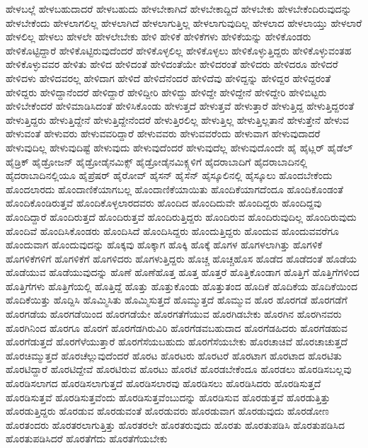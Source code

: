 {ಹೇಳಬಲ್ಲೆ
ಹೇಳಬಹುದಾದರೆ
ಹೇಳಬಹುದು
ಹೇಳಬೇಕಾಗಿದೆ
ಹೇಳಬೇಕಾದ್ದಿದೆ
ಹೇಳಬೇಕು
ಹೇಳಬೇಕೆಂದಿರುವುದನ್ನು
ಹೇಳಬೇಕೆಂದು
ಹೇಳಲಾಗಲಿಲ್ಲ
ಹೇಳಲಾಗಿದೆ
ಹೇಳಲಾಗುತ್ತಿಲ್ಲ
ಹೇಳಲಾಗುವುದಿಲ್ಲ
ಹೇಳಲಾದ
ಹೇಳಲಾಯ್ತು
ಹೇಳಲಾರೆ
ಹೇಳಲಿಲ್ಲ
ಹೇಳಲು
ಹೇಳಲೇ
ಹೇಳಲೇಬೇಕು
ಹೇಳಿ
ಹೇಳಿಕೆ
ಹೇಳಿಕೆಗಳು
ಹೇಳಿಕೆಯನ್ನು
ಹೇಳಿಕೊಂಡರು
ಹೇಳಿಕೊಟ್ಟಿದ್ದಾರೆ
ಹೇಳಿಕೊಟ್ಟಿರುವುದೆಂದರೆ
ಹೇಳಿಕೊಳ್ಳಲಿಲ್ಲ
ಹೇಳಿಕೊಳ್ಳಲು
ಹೇಳಿಕೊಳ್ಳುತ್ತಿದ್ದರು
ಹೇಳಿಕೊಳ್ಳುವಂತಹ
ಹೇಳಿಕೊಳ್ಳುವವರ
ಹೇಳಿತು
ಹೇಳಿದ
ಹೇಳಿದಂತೆ
ಹೇಳಿದಂತೆಯೇ
ಹೇಳಿದರಂತೆ
ಹೇಳಿದರು
ಹೇಳಿದರೂ
ಹೇಳಿದರೆ
ಹೇಳಿದಳು
ಹೇಳಿದವರಲ್ಲ
ಹೇಳಿದಾಗ
ಹೇಳಿದೆ
ಹೇಳಿದೆನೆಂದರೆ
ಹೇಳಿದೆವು
ಹೇಳಿದ್ದನ್ನು
ಹೇಳಿದ್ದರ
ಹೇಳಿದ್ದರಂತೆ
ಹೇಳಿದ್ದರು
ಹೇಳಿದ್ದಾನೆಂದರೆ
ಹೇಳಿದ್ದಾರೆ
ಹೇಳಿದ್ದೀರಿ
ಹೇಳಿದ್ದು
ಹೇಳಿದ್ದೇ
ಹೇಳಿದ್ದೇನೆ
ಹೇಳಿದ್ದೇರಿ
ಹೇಳಿಬಿಟ್ಟರು
ಹೇಳಿಬೇಕೆಂದರೆ
ಹೇಳಿಮಾಡಿಸಿದಂತೆ
ಹೇಳಿಸಿಕೊಂಡು
ಹೇಳುತ್ತದೆ
ಹೇಳುತ್ತವೆ
ಹೇಳುತ್ತಾರೆ
ಹೇಳುತ್ತಿದ್ದ
ಹೇಳುತ್ತಿದ್ದರಂತೆ
ಹೇಳುತ್ತಿದ್ದರು
ಹೇಳುತ್ತಿದ್ದೇನೆ
ಹೇಳುತ್ತಿದ್ದೇನೆಂದರೆ
ಹೇಳುತ್ತಿರಲಿಲ್ಲ
ಹೇಳುತ್ತಿಲ್ಲ
ಹೇಳುತ್ತಿಲ್ಲತಾನೆ
ಹೇಳುತ್ತೇನೆ
ಹೇಳುವ
ಹೇಳುವಂತೆ
ಹೇಳುವರು
ಹೇಳುವವರಿದ್ದಾರೆ
ಹೇಳುವವರು
ಹೇಳುವವರೆಂದು
ಹೇಳುವಾಗ
ಹೇಳುವುದಾದರೆ
ಹೇಳುವುದಿಲ್ಲ
ಹೇಳುವುದಿಷ್ಟೆ
ಹೇಳುವುದು
ಹೇಳುವುದೆಂದರೆ
ಹೇಳುವುದೆಲ್ಲ
ಹೇಳುವುದೊಂದೇ
ಹೈ
ಹೈಟ್ಲರ್
ಹೈಡೆಲ್
ಹೈಡ್ರಿಕ್
ಹೈಡ್ರೋಜನ್
ಹೈಡ್ರೋಡೈನಮಿಕ್ಸ್
ಹೈಡ್ರೋಡೈನಮಿಕ್ಸ್ಗಳಿಗೆ
ಹೈದರಾಬಾದಿಗೆ
ಹೈದರಾಬಾದಿನಲ್ಲಿ
ಹೈದರಾಬಾದಿನಲ್ಲಿಯೂ
ಹೈಪ್ರೆಷರ್
ಹೈರೋವ್
ಹೈಸನ್
ಹೈಸೆನ್
ಹೈಸ್ಕೂಲಿನಲ್ಲಿ
ಹೈಸ್ಕೂಲು
ಹೊಂದಬೇಕೆಂದು
ಹೊಂದಲಾರದು
ಹೊಂದಾಣಿಕೆಯಾಗಬಲ್ಲ
ಹೊಂದಾಣಿಕೆಯಾಯಿತು
ಹೊಂದಿಕೆಯಾಗದೆಂದೂ
ಹೊಂದಿಕೊಂಡಂತೆ
ಹೊಂದಿಕೊಂಡಿರುತ್ತವೆ
ಹೊಂದಿಕೊಳ್ಳಲಾರದವರು
ಹೊಂದಿದ
ಹೊಂದಿದುವೇ
ಹೊಂದಿದ್ದರು
ಹೊಂದಿದ್ದವು
ಹೊಂದಿದ್ದಾರೆ
ಹೊಂದಿರುತ್ತದೆ
ಹೊಂದಿರುತ್ತವೆ
ಹೊಂದಿರುತ್ತಿದ್ದರು
ಹೊಂದಿರುವ
ಹೊಂದಿರುವುದಿಲ್ಲ
ಹೊಂದಿರುವುದು
ಹೊಂದಿವೆ
ಹೊಂದಿಸಿಕೊಂಡರು
ಹೊಂದಿಸಿದೆ
ಹೊಂದಿಸಿದ್ದರು
ಹೊಂದುತ್ತಿದ್ದರು
ಹೊಂದುವ
ಹೊಂದುವವರೆಗೂ
ಹೊಂದುವಾಗ
ಹೊಂದುವುದನ್ನು
ಹೊಕ್ಕವು
ಹೊಕ್ಕಾಗ
ಹೊಕ್ಕಿ
ಹೊಕ್ಕೆ
ಹೊಗಳ
ಹೊಗಳಲಾಗಿತ್ತು
ಹೊಗಳಿಕೆ
ಹೊಗಳಿಕೆಗಳಿಗೆ
ಹೊಗಳಿಕೆಗೆ
ಹೊಗಳಿದರು
ಹೊಗಳುತ್ತಿದ್ದರು
ಹೊಚ್ಚ
ಹೊಚ್ಚಹೊಸ
ಹೊಡೆದ
ಹೊಡೆದಂತೆ
ಹೊಡೆಯ
ಹೊಡೆಯುವ
ಹೊಡೆಯುವುದನ್ನು
ಹೊಣೆ
ಹೊಣೆಹೊತ್ತ
ಹೊತ್ತ
ಹೊತ್ತರೆ
ಹೊತ್ತಿಕೊಂಡಾಗ
ಹೊತ್ತಿಗೆ
ಹೊತ್ತಿಗೆಗಳಿಂದ
ಹೊತ್ತಿಗೆಗಳು
ಹೊತ್ತಿಗೆಯಲ್ಲಿ
ಹೊತ್ತಿದ್ದೆ
ಹೊತ್ತು
ಹೊತ್ತುಕೊಂಡು
ಹೊತ್ತುತಂದ
ಹೊದಿಕೆ
ಹೊದಿಕೆಯ
ಹೊದಿಕೆಯಿಂದ
ಹೊದಿಕೆಯಿತ್ತು
ಹೊದ್ದಿಸಿ
ಹೊಮ್ಮಿಸಿತು
ಹೊಮ್ಮಿಸುತ್ತದೆ
ಹೊಮ್ಮುತ್ತದೆ
ಹೊಮ್ಮುವ
ಹೊರ
ಹೊರಗಡೆ
ಹೊರಗಡೆಗೆ
ಹೊರಗಡೆಯ
ಹೊರಗಡೆಯಿಂದ
ಹೊರಗಡೆಯೇ
ಹೊರಗತೆಗೆಯುವ
ಹೊರಗಿಡಬೇಕು
ಹೊರಗಿನ
ಹೊರಗಿನವರು
ಹೊರಗಿನಿಂದ
ಹೊರಗೂ
ಹೊರಗೆ
ಹೊರಗೆಡಗಿರುವಿರಿ
ಹೊರಗೆಡವಬಹುದಾದ
ಹೊರಗೆಡಹಿದರು
ಹೊರಗೆಡಹುವ
ಹೊರಗೆಡುತ್ತದೆ
ಹೊರಗೆಳೆಯುತ್ತಾರೆ
ಹೊರಗೆಸೆಯಬಹುದು
ಹೊರಗೆಸೆಯಬೇಕು
ಹೊರಚಾಚಿವೆ
ಹೊರಚಾಚುತ್ತದೆ
ಹೊರಚಿಮ್ಮುತ್ತದೆ
ಹೊರಚೆಲ್ಲುವುದೆಂದರೆ
ಹೊರಟ
ಹೊರಟರು
ಹೊರಟರೆ
ಹೊರಟಾಗ
ಹೊರಟಾದ
ಹೊರಟಿತು
ಹೊರಟಿದ್ದಾರೆ
ಹೊರಟಿದ್ದೇವೆ
ಹೊರಟಿರುವ
ಹೊರಟು
ಹೊರಟೆ
ಹೊರಡಬೇಕೆಂದೂ
ಹೊರಡಲು
ಹೊರಡಿಸಬಲ್ಲವು
ಹೊರಡಿಸಲಾಗದ
ಹೊರಡಿಸಲಾಗುತ್ತದೆ
ಹೊರಡಿಸಲಾರವು
ಹೊರಡಿಸಲು
ಹೊರಡಿಸಿದರು
ಹೊರಡಿಸುತ್ತದೆ
ಹೊರಡಿಸುತ್ತವೆ
ಹೊರಡಿಸುತ್ತವೆಂದು
ಹೊರಡಿಸುತ್ತವೆಂಬುದನ್ನು
ಹೊರಡಿಸುವ
ಹೊರಡುತ್ತವೆ
ಹೊರಡುತ್ತಿತ್ತು
ಹೊರಡುತ್ತಿದ್ದರು
ಹೊರಡುವ
ಹೊರಡುವಂತೆ
ಹೊರಡುವರು
ಹೊರಡುವಾಗ
ಹೊರಡುವುದು
ಹೊರಡೋಣ
ಹೊರತಂದರು
ಹೊರತರಲಾಗುತ್ತಿತ್ತು
ಹೊರತರಲೇ
ಹೊರತರುವುದು
ಹೊರತು
ಹೊರತುಪಡಿಸಿ
ಹೊರತುಪಡಿಸಿದ
ಹೊರತುಪಡಿಸಿದರೆ
ಹೊರತೆಗೆದು
ಹೊರತೆಗೆಯಬೇಕು
}
